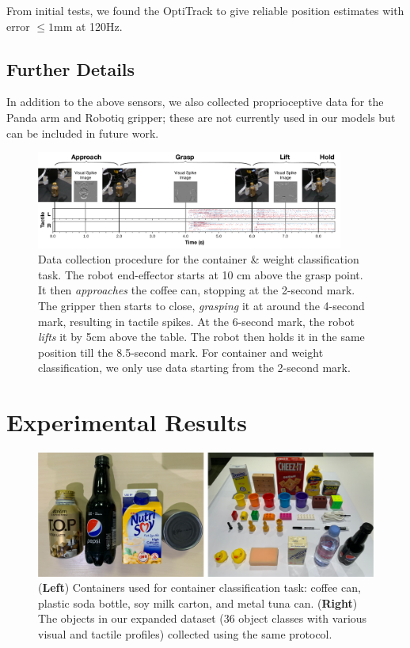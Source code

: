 \documentclass[fyp]{socreport}
\begin{document}
From initial tests, we found the OptiTrack to give reliable position estimates
with error $\leq 1$mm at 120Hz.

\section{Further Details}
In addition to the above sensors, we also collected proprioceptive data for the
Panda arm and Robotiq gripper; these are not currently used in our models but
can be included in future work.

\begin{figure}
\centering
\includegraphics[width=0.90\textwidth]{images/robotsetup/RobotMotion_Exp1.pdf}
\caption{Data collection procedure for the container \& weight classification
  task. The robot end-effector starts at 10 cm above the grasp point. It then
  \emph{approaches} the coffee can, stopping at the 2-second mark. The gripper
  then starts to close, \emph{grasping} it at around the 4-second mark,
  resulting in tactile spikes. At the 6-second mark, the robot \emph{lifts} it
  by 5cm above the table. The robot then holds it in the same position till the
  8.5-second mark. For container and weight classification, we only use data
  starting from the 2-second mark.}
\label{fig:robot_motion}
\end{figure}


\chapter{Experimental Results\label{cha:exp_results}}

\begin{figure}
\centering
\includegraphics[width=0.87\columnwidth]{images/robotsetup/objects_exp1_small.png}
\caption{(\textbf{Left}) Containers used for container classification task:
  coffee can, plastic soda bottle, soy milk carton, and metal tuna can.
  (\textbf{Right}) The objects in our expanded dataset ($36$ object classes with
  various visual and tactile profiles) collected using the same protocol.}
\label{fig:expobjects}
\end{figure}
\end{document}
